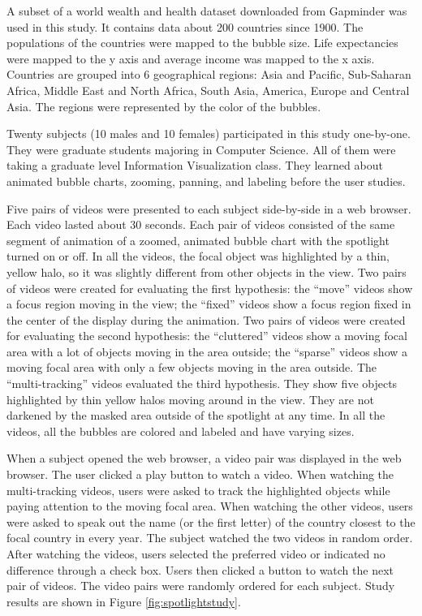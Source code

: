 \documentclass[review]{vgtc}                 %
\begin{document}
A subset of a world wealth and health dataset downloaded from Gapminder \cite{rosling_gapminder_2006} was used in this study. It contains data about 200 countries since 1900. The populations of the countries were mapped to the bubble size. Life expectancies were mapped to the y axis and average income was mapped to the x axis. Countries are grouped into 6 geographical regions: Asia and Pacific, Sub-Saharan Africa, Middle East and North Africa, South Asia, America, Europe and Central Asia. The regions were represented by the color of the bubbles.

Twenty subjects (10 males and 10 females) participated in this study one-by-one. They were graduate students majoring in Computer Science. All of them were taking a graduate level Information Visualization class. They learned about animated bubble charts, zooming, panning, and labeling before the user studies.

Five pairs of videos were presented to each subject side-by-side in a web browser. Each video lasted about 30 seconds. Each pair of videos consisted of the same segment of animation of a zoomed, animated bubble chart with the spotlight turned on or off. In all the videos, the focal object was highlighted by a thin, yellow halo, so it was slightly different from other objects in the view. Two pairs of videos were created for evaluating the first hypothesis: the ``move'' videos show a focus region moving in the view; the ``fixed'' videos show a focus region fixed in the center of the display during the animation. Two pairs of videos were created for evaluating the second hypothesis: the ``cluttered'' videos show a moving focal area with a lot of objects moving in the area outside; the ``sparse'' videos show a moving focal area with only a few objects moving in the area outside. The ``multi-tracking'' videos evaluated the third hypothesis. They show five objects highlighted by thin yellow halos moving around in the view. They are not darkened by the masked area outside of the spotlight at any time. In all the videos, all the bubbles are colored and labeled and have varying sizes.

When a subject opened the web browser, a video pair was displayed in the web browser. The user clicked a play button to watch a video. When watching the multi-tracking videos, users were asked to track the highlighted objects while paying attention to the moving focal area. When watching the other videos, users were asked to speak out the name (or the first letter) of the country closest to the focal country in every year. The subject watched the two videos in random order. After watching the videos, users selected the preferred video or indicated no difference through a check box. Users then clicked a button to watch the next pair of videos. The video pairs were randomly ordered for each subject. Study results are shown in Figure \ref{fig:spotlightstudy}.
\end{document}
